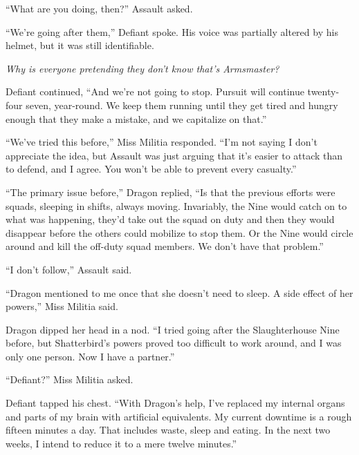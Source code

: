``What are you doing, then?'' Assault asked.



``We're going after them,'' Defiant spoke.  His voice was partially altered by his helmet, but it was still identifiable.



\emph{Why is everyone pretending they don't know that's Armsmaster?}



Defiant continued, ``And we're not going to stop.  Pursuit will continue twenty-four seven, year-round.  We keep them running until they get tired and hungry enough that they make a mistake, and we capitalize on that.''



``We've tried this before,''  Miss Militia responded.  ``I'm not saying I don't appreciate the idea, but Assault was just arguing that it's easier to attack than to defend, and I agree.  You won't be able to prevent every casualty.''



``The primary issue before,'' Dragon replied, ``Is that the previous efforts were squads, sleeping in shifts, always moving.  Invariably, the Nine would catch on to what was happening, they'd take out the squad on duty and then they would disappear before the others could mobilize to stop them.  Or the Nine would circle around and kill the off-duty squad members.  We don't have that problem.''



``I don't follow,'' Assault said.



``Dragon mentioned to me once that she doesn't need to sleep.  A side effect of her powers,'' Miss Militia said.



Dragon dipped her head in a nod.  ``I tried going after the Slaughterhouse Nine before, but Shatterbird's powers proved too difficult to work around, and I was only one person.  Now I have a partner.''



``Defiant?''  Miss Militia asked.



Defiant tapped his chest.  ``With Dragon's help, I've replaced my internal organs and parts of my brain with artificial equivalents.  My current downtime is a rough fifteen minutes a day. That includes waste, sleep and eating.  In the next two weeks, I intend to reduce it to a mere twelve minutes.''



